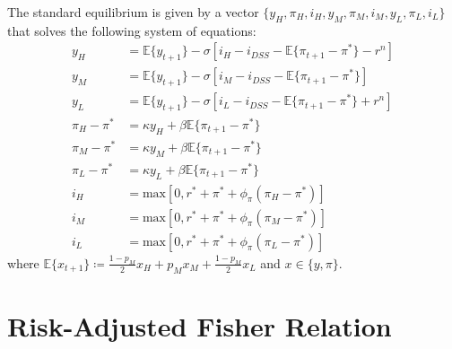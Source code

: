 \documentclass[11pt]{article}
\begin{document}
	The standard equilibrium is given by a vector $\{y_H,\pi_H,i_H,y_M,\pi_M,i_M,y_L,\pi_L,i_L\}$ that solves the following system of equations: 
	\begin{align}
		y_{H} & = \mathbb{E}\{y_{t+1}\} - \sigma\left[i_{H} - i_{DSS} - \mathbb{E}\{\pi_{t+1} - \pi^*\}-r^n\right] \label{eq:EE_H} \\
		y_{M} & = \mathbb{E}\{y_{t+1}\} - \sigma\left[i_{M} - i_{DSS} - \mathbb{E}\{\pi_{t+1} - \pi^*\}\right] \label{eq:EE_M}\\
		y_{L} & = \mathbb{E}\{y_{t+1}\} - \sigma\left[i_{L} - i_{DSS} - \mathbb{E}\{\pi_{t+1} - \pi^*\}+r^n\right] \label{eq:EE_L}\\
		\pi_{H} - \pi^* & = \kappa y_{H} + \beta\mathbb{E}\{\pi_{t+1} - \pi^*\} \label{eq:PC_H}\\
		\pi_{M} - \pi^* & = \kappa y_{M} + \beta\mathbb{E}\{\pi_{t+1} - \pi^*\} \label{eq:PC_M}\\
		\pi_{L} - \pi^* & = \kappa y_{L} + \beta\mathbb{E}\{\pi_{t+1} - \pi^*\} \label{eq:PC_L}\\
		i_{H} & = \text{max}\left[0, r^* + \pi^* +  \phi_{\pi}(\pi_{H} - \pi^*)\right] \label{eq:TR_H}\\
		i_{M} & = \text{max}\left[0, r^* + \pi^* + \phi_{\pi}(\pi_{M} - \pi^*)\right] \label{eq:TR_M}\\
		i_{L} & = \text{max}\left[0, r^* + \pi^* + \phi_{\pi}(\pi_{L} - \pi^*)\right] \label{eq:TR_L}
	\end{align}
	where $\mathbb{E}\{x_{t+1}\} \coloneqq \frac{1-p_M}{2}x_H + p_Mx_M + \frac{1-p_M}{2}x_L$ and $x\in\{y,\pi\}$.
	\section{Risk-Adjusted Fisher Relation}
	
\end{document}
